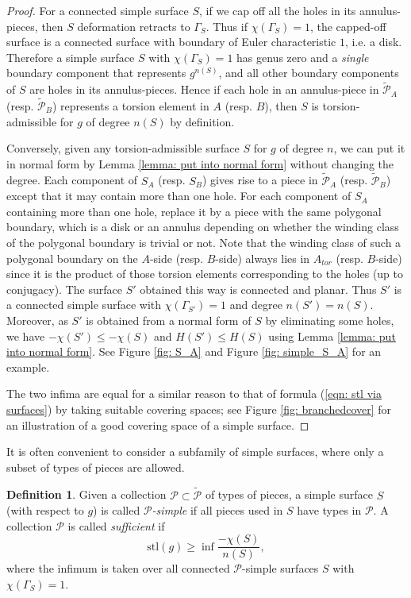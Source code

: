 \documentclass{amsart}
\theoremstyle{definition}
\newtheorem{definition}[theorem]{Definition}
\numberwithin{equation}{section}
\theoremstyle{theorem}
\theoremstyle{remark}
\def\stl{\mathrm{stl}}
\def\tcP{\widetilde{\mathcal{P}}}
\begin{document}
	\begin{proof}
		For a connected simple surface $S$, if we cap off all the holes in its annulus-pieces, then $S$ deformation retracts to $\Gamma_S$. 
		Thus if $\chi(\Gamma_S)=1$, the capped-off surface is a connected surface with boundary of Euler characteristic $1$, i.e. a disk.
		Therefore a simple surface $S$ with $\chi(\Gamma_S)=1$ has genus zero and a \emph{single} boundary component that represents $g^{n(S)}$, and all other boundary components of $S$
		are holes in its annulus-pieces. Hence if each hole in an annulus-piece in $\tcP_A$ (resp. $\tcP_B$) represents a torsion element in $A$ (resp. $B$), then $S$ is torsion-admissible for $g$ of degree $n(S)$ by definition.
		
		Conversely, given any torsion-admissible surface $S$ for $g$ of degree $n$, we can put it in normal form by Lemma \ref{lemma: put into normal form} without changing the degree. Each component of $S_A$ (resp. $S_B$) gives rise to a piece in $\tcP_A$ (resp. $\tcP_B$) except that it may contain more than one hole. For each component of $S_A$ containing more than one hole, replace it by a piece with the same polygonal boundary, which is a disk or an annulus depending on whether the winding class of the polygonal boundary is trivial or not. 
		Note that the winding class of such a polygonal boundary on the $A$-side (resp. $B$-side) always lies in $A_{tor}$ (resp. $B$-side) since it is the product of those torsion elements corresponding to the holes (up to conjugacy).
		The surface $S'$ obtained this way is connected and planar. Thus $S'$ is a connected simple surface with $\chi(\Gamma_{S'})=1$ and degree $n(S')=n(S)$. Moreover, as $S'$ is obtained from a normal form of $S$ by eliminating some holes, we have $-\chi(S')\le -\chi(S)$ and $H(S')\le H(S)$ using Lemma \ref{lemma: put into normal form}. See Figure \ref{fig: S_A} and Figure \ref{fig: simple_S_A} for an example.
		
		The two infima are equal for a similar reason to that of formula (\ref{eqn: stl via surfaces}) by taking suitable covering spaces; see Figure \ref{fig: branchedcover} for an illustration of a good covering space of a simple surface.
	\end{proof}
	
	It is often convenient to consider a subfamily of simple surfaces, where only a subset of types of pieces are allowed. 
	\begin{definition}\label{def: sufficient collection}
		Given a collection $\mathcal{P}\subset\tcP$ of types of pieces, a simple surface $S$ (with respect to $g$) is called \emph{$\mathcal{P}$-simple} if all pieces used in $S$ have types in $\mathcal{P}$.
		A collection $\mathcal{P}$ is called \emph{sufficient} if
		$$
		\stl(g)\ge\inf \frac{-\chi(S)}{n(S)},
		$$
		where the infimum is taken over all connected $\mathcal{P}$-simple surfaces $S$ with $\chi(\Gamma_S)=1$.
	\end{definition}
	
\end{document}
